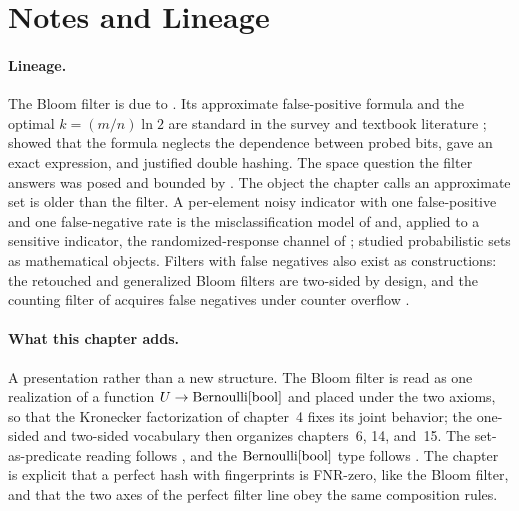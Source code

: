 %

\section{Notes and Lineage}
\label{sec:bib-notes-ch5}

\paragraph{Lineage.}
The Bloom filter is due to \textcite{bloomfilter}. Its approximate
false-positive formula and the optimal $k = (m/n)\ln 2$ are standard in the
survey and textbook literature \parencite{broder-mitzenmacher-2004,mitzenmacher-upfal};
\textcite{bose-et-al-2008} showed that the formula neglects the dependence
between probed bits, \textcite{christensen-roginsky-jimeno-2010} gave an exact
expression, and \textcite{kirsch-mitzenmacher-2008} justified double hashing.
The space question the filter answers was posed and bounded by
\textcite{carter-et-al-1978}. The object the chapter calls an approximate set
is older than the filter. A per-element noisy indicator with one
false-positive and one false-negative rate is the misclassification model of
\textcite{bross-1954} and, applied to a sensitive indicator, the
randomized-response channel of \textcite{warner-1965};
\textcite{hirota-1981} studied probabilistic sets as mathematical objects.
Filters with false negatives also exist as constructions: the retouched
\parencite{donnet-baynat-friedman-2006} and generalized
\parencite{laufer-velloso-duarte-2011} Bloom filters are two-sided by design,
and the counting filter of \textcite{fan-et-al-2000} acquires false negatives
under counter overflow \parencite{guo-et-al-2010}.

\paragraph{What this chapter adds.}
A presentation rather than a new structure. The Bloom filter is read as one
realization of a function $U \to \mathrm{Bernoulli}[\mathrm{bool}]$ and placed
under the two axioms, so that the Kronecker factorization of chapter~4 fixes
its joint behavior; the one-sided and two-sided vocabulary then organizes
chapters~6, 14, and~15. The set-as-predicate reading follows
\textcite{towell-bernoulli-sets}, and the $\mathrm{Bernoulli}[\mathrm{bool}]$ type follows
\textcite{towell-bernoulli-data-type}. The chapter is explicit that a perfect
hash with fingerprints is FNR-zero, like the Bloom filter, and that the two
axes of the perfect filter line obey the same composition rules.

